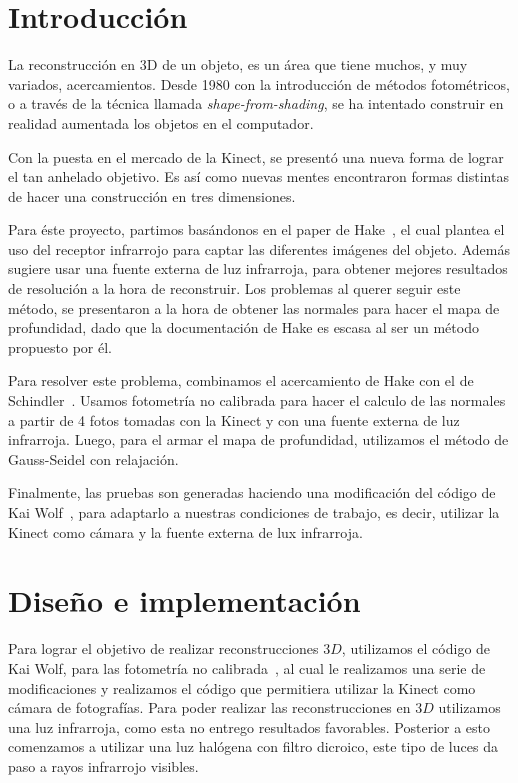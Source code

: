 \documentclass[twocolumn,11pts]{IEEEtran}
\begin{document}
\section{Introducción}
La reconstrucción en 3D de un objeto, es un área que tiene muchos, y muy variados, acercamientos. Desde 1980 con la introducción de métodos fotométricos, o a través de la técnica llamada \textit{shape-from-shading}, se ha intentado construir en realidad aumentada los objetos en el computador.

Con la puesta en el mercado de la Kinect, se presentó una nueva forma de lograr el tan anhelado objetivo. Es así como nuevas mentes encontraron formas distintas de hacer una construcción en tres dimensiones.

Para éste proyecto, partimos basándonos en el paper de Hake~\cite{ourpaper}, el cual plantea el uso del receptor infrarrojo para captar las diferentes imágenes del objeto. Además sugiere usar una fuente externa de luz infrarroja, para obtener mejores resultados de resolución a la hora de reconstruir. Los problemas al querer seguir este método, se presentaron a la hora de obtener las normales para hacer el mapa de profundidad, dado que la documentación de Hake es escasa al ser un método propuesto por él. 

Para resolver este problema, combinamos el acercamiento de Hake con el de Schindler~\cite{elotro}. Usamos fotometría no calibrada para hacer el calculo de las normales a partir de 4 fotos tomadas con la Kinect y con una fuente externa de luz infrarroja. Luego, para el armar el mapa de profundidad, utilizamos el método de Gauss-Seidel con relajación.

Finalmente, las pruebas son generadas haciendo una modificación del código de Kai Wolf~\cite{repo}, para adaptarlo a nuestras condiciones de trabajo, es decir, utilizar la Kinect como cámara y la fuente externa de lux infrarroja.
 
\section{Diseño e implementación }
Para lograr el objetivo de realizar reconstrucciones $3D$, utilizamos el código de Kai Wolf, para las fotometría no calibrada~\cite{repo}, al cual le realizamos una serie de modificaciones y realizamos el código que permitiera utilizar la Kinect como cámara de fotografías. Para poder realizar las reconstrucciones en $3D$ utilizamos una luz infrarroja, como esta no entrego resultados favorables. Posterior a esto comenzamos a utilizar una luz halógena con filtro dicroico, este tipo de luces da paso a rayos infrarrojo visibles.
\end{document}
